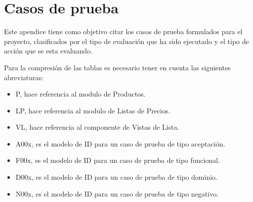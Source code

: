 \chapter{Casos de prueba}\label{appendix_testscases}
Este apendice tiene como objetivo citar los casos de prueba formulados para el
proyecto, clasificados por el tipo de evaluación que ha sido ejecutado y el tipo
de acción que se esta evaluando.

Para la compresión de las tablas es necesario tener en cuenta las siguientes
abreviaturas:

\begin{itemize}
    \item P, hace referencia al modulo de Productos.
    \item LP, hace referencia al modulo de Listas de Precios.
    \item VL, hace referencia al componente de Vistas de Lista.
    \item A00x, es el modelo de ID para un caso de prueba de tipo aceptación.
    \item F00x, es el modelo de ID para un caso de prueba de tipo funcional.
    \item D00x, es el modelo de ID para un caso de prueba de tipo dominio.
    \item N00x, es el modelo de ID para un caso de prueba de tipo negativo.
\end{itemize}

